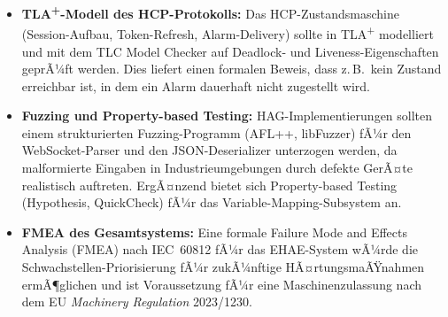 ﻿\documentclass[12pt,a4paper]{article}
\begin{document}
\begin{itemize}[leftmargin=2em]
  \item \textbf{TLA\textsuperscript{+}-Modell des HCP-Protokolls:} Das
    HCP-Zustandsmaschine (Session-Aufbau, Token-Refresh, Alarm-Delivery) sollte
    in TLA\textsuperscript{+} modelliert und mit dem TLC Model Checker auf
    Deadlock- und Liveness-Eigenschaften geprÃ¼ft werden. Dies liefert einen
    formalen Beweis, dass z.\,B.\ kein Zustand erreichbar ist, in dem ein
    Alarm dauerhaft nicht zugestellt wird.
  \item \textbf{Fuzzing und Property-based Testing:} HAG-Implementierungen
    sollten einem strukturierten Fuzzing-Programm (AFL++, libFuzzer) fÃ¼r
    den WebSocket-Parser und den JSON-Deserializer unterzogen werden, da
    malformierte Eingaben in Industrieumgebungen durch defekte GerÃ¤te
    realistisch auftreten. ErgÃ¤nzend bietet sich Property-based Testing
    (Hypothesis, QuickCheck) fÃ¼r das Variable-Mapping-Subsystem an.
  \item \textbf{FMEA des Gesamtsystems:} Eine formale Failure Mode and Effects
    Analysis (FMEA) nach IEC~60812 fÃ¼r das EHAE-System wÃ¼rde die
    Schwachstellen-Priorisierung fÃ¼r zukÃ¼nftige HÃ¤rtungsmaÃŸnahmen ermÃ¶glichen
    und ist Voraussetzung fÃ¼r eine Maschinenzulassung nach dem EU \emph{Machinery
    Regulation} 2023/1230.
\end{itemize}

%
\end{document}
